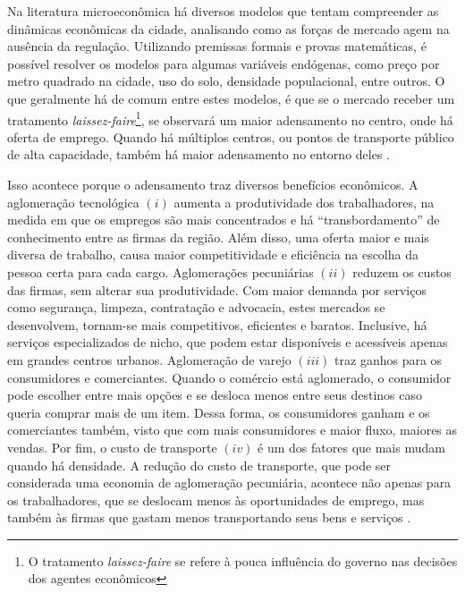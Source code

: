 Na literatura microeconômica há diversos modelos que tentam compreender as dinâmicas econômicas da cidade, analisando como as forças de mercado agem na ausência da regulação. Utilizando premissas formais e provas matemáticas, é possível resolver os modelos para algumas variáveis endógenas, como preço por metro quadrado na cidade, uso do solo, densidade populacional, entre outros. O que geralmente há de comum entre estes modelos, é que se o mercado receber um tratamento \textit{laissez-faire}\footnote{O tratamento \textit{laissez-faire} se refere à pouca influência do governo nas decisões dos agentes econômicos}, se observará um maior adensamento no centro, onde há oferta de emprego. Quando há múltiplos centros, ou pontos de transporte público de alta capacidade, também há maior adensamento no entorno deles \cite{papageorgiou2012essay, fujita1989urban}.


Isso acontece porque o adensamento traz diversos benefícios econômicos. A aglomeração tecnológica $(i)$ aumenta a produtividade dos trabalhadores, na medida em que os empregos são mais concentrados e há ``transbordamento'' de conhecimento entre as firmas da região. Além disso, uma oferta maior e mais diversa de trabalho, causa maior competitividade e eficiência na escolha da pessoa certa para cada cargo. Aglomerações pecuniárias $(ii)$ reduzem os custos das firmas, sem alterar sua produtividade. Com maior demanda por serviços como segurança, limpeza, contratação e advocacia, estes mercados se desenvolvem, tornam-se mais competitivos, eficientes e baratos. Inclusive, há serviços especializados de nicho, que podem estar disponíveis e acessíveis apenas em grandes centros urbanos. Aglomeração de varejo $(iii)$ traz ganhos para os consumidores e comerciantes. Quando o comércio está aglomerado, o consumidor pode escolher entre mais opções e se desloca menos entre seus destinos caso queria comprar mais de um item. Dessa forma, os consumidores ganham e os comerciantes também, visto que com mais consumidores e maior fluxo, maiores as vendas. Por fim, o custo de transporte $(iv)$ é um dos fatores que mais mudam quando há densidade. A redução do custo de transporte, que pode ser considerada uma economia de aglomeração pecuniária, acontece não apenas para os trabalhadores, que se deslocam menos às oportunidades de emprego, mas também às firmas que gastam menos transportando seus bens e serviços \cite{brueckner2011lectures}.

